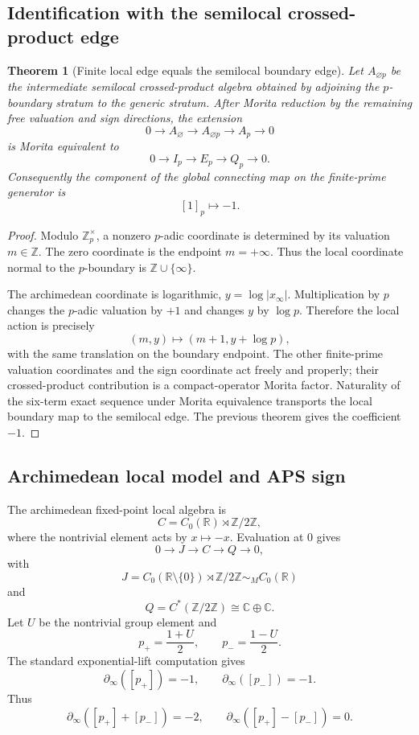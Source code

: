 \documentclass[11pt]{article}
\newtheorem{theorem}{Theorem}[section]
\newcommand{\ZZ}{\mathbb Z}
\newcommand{\RR}{\mathbb R}
\newcommand{\CC}{\mathbb C}
\begin{document}
\subsection{Identification with the semilocal crossed-product edge}

\begin{theorem}[Finite local edge equals the semilocal boundary edge]
Let $A_{\varnothing p}$ be the intermediate semilocal crossed-product algebra obtained by adjoining the $p$-boundary stratum to the generic stratum.  After Morita reduction by the remaining free valuation and sign directions, the extension
\[
        0\to A_\varnothing\to A_{\varnothing p}\to A_p\to0
\]
is Morita equivalent to
\[
        0\to I_p\to E_p\to Q_p\to0.
\]
Consequently the component of the global connecting map on the finite-prime generator is
\[
        [1]_p\longmapsto -1.
\]
\end{theorem}

\begin{proof}
Modulo $\ZZ_p^\times$, a nonzero $p$-adic coordinate is determined by its valuation $m\in\ZZ$.  The zero coordinate is the endpoint $m=+\infty$.  Thus the local coordinate normal to the $p$-boundary is $\ZZ\cup\{\infty\}$.

The archimedean coordinate is logarithmic, $y=\log|x_\infty|$.  Multiplication by $p$ changes the $p$-adic valuation by $+1$ and changes $y$ by $\log p$.  Therefore the local action is precisely
\[
        (m,y)\mapsto(m+1,y+\log p),
\]
with the same translation on the boundary endpoint.  The other finite-prime valuation coordinates and the sign coordinate act freely and properly; their crossed-product contribution is a compact-operator Morita factor.  Naturality of the six-term exact sequence under Morita equivalence transports the local boundary map to the semilocal edge.  The previous theorem gives the coefficient $-1$.
\end{proof}

\subsection{Archimedean local model and APS sign}

The archimedean fixed-point local algebra is
\[
        C=C_0(\RR)\rtimes \ZZ/2\ZZ,
\]
where the nontrivial element acts by $x\mapsto -x$.  Evaluation at $0$ gives
\[
        0\to J\to C\to Q\to0,
\]
with
\[
        J=C_0(\RR\setminus\{0\})\rtimes\ZZ/2\ZZ\sim_M C_0(\RR)
\]
and
\[
        Q=C^*(\ZZ/2\ZZ)\cong\CC\oplus\CC.
\]
Let $U$ be the nontrivial group element and
\[
        p_+=\frac{1+U}{2},\qquad p_-=\frac{1-U}{2}.
\]
The standard exponential-lift computation gives
\[
        \partial_\infty([p_+])=-1,
        \qquad
        \partial_\infty([p_-])=-1.
\]
Thus
\[
        \partial_\infty([p_+]+[p_-])=-2,
        \qquad
        \partial_\infty([p_+]-[p_-])=0.
\]
\end{document}

